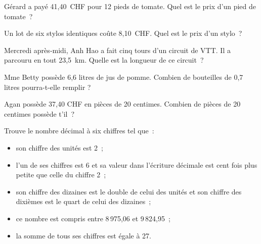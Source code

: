 \begin{exercice}
Gérard a payé 41,40 CHF pour 12 pieds de tomate. Quel est le prix d'un pied de tomate ?
\end{exercice}



\begin{exercice}
Un lot de six stylos identiques coûte 8,10 CHF. Quel est le prix d'un stylo ?
\end{exercice}


\begin{exercice}
Mercredi après‑midi, Anh Hao a fait cinq tours d'un circuit de VTT. Il a parcouru en tout 23,5 km. Quelle est la longueur de ce circuit ?
\end{exercice}


\begin{exercice}
Mme Betty possède 6,6 litres de jus de pomme. Combien de bouteilles de 0,7 litres pourra-t-elle remplir ?
\end{exercice}

\begin{exercice}
Agan possède 37,40 CHF en pièces de 20 centimes. Combien de pièces de 20 centimes possède t'il ?
\end{exercice}


\begin{exercice}[Énigme]
Trouve le nombre décimal à six chiffres tel que :
\begin{itemize}
 \item son chiffre des unités est 2 ;
 \item l'un de ses chiffres est 6 et sa valeur dans l'écriture décimale est cent fois plus petite que celle du chiffre 2 ;
 \item son chiffre des dizaines est le double de celui des unités et son chiffre des dixièmes est le quart de celui des dizaines ;
 \item ce nombre est compris entre 8\,975,06 et 9\,824,95 ;
 \item la somme de tous ses chiffres est égale à 27.
 \end{itemize}
\end{exercice}



